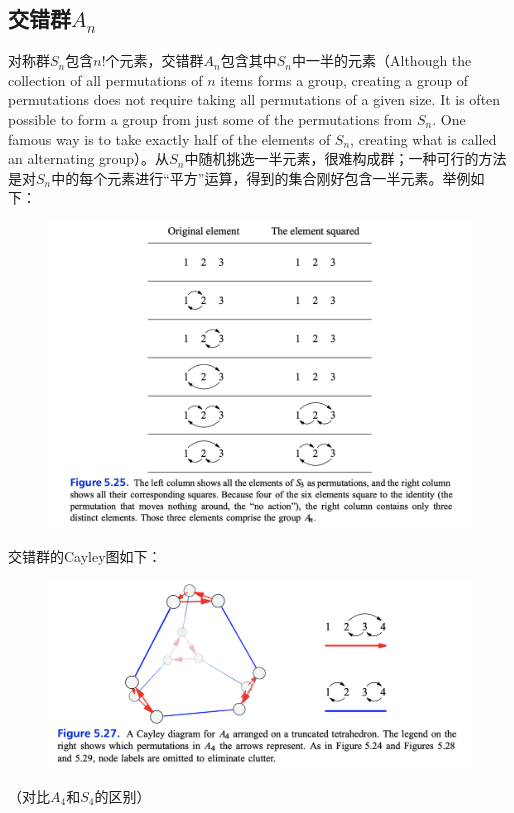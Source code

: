 \documentclass[12pt]{article}
\begin{document}
\subsection{交错群$A_n$}
对称群$S_n$包含$n!$个元素，交错群$A_n$包含其中$S_n$中一半的元素（Although the collection of all permutations of $n$ items forms a group, creating a group of permutations does not require taking all permutations of a given size. It is often possible to form a group from just some of the permutations from $S_n$. One famous way is to take exactly half of the elements of $S_n$, creating what is called an alternating group）。从$S_n$中随机挑选一半元素，很难构成群；一种可行的方法是对$S_n$中的每个元素进行“平方”运算，得到的集合刚好包含一半元素。举例如下：
\begin{figure}[H]
    \centering
    \includegraphics[width=1\textwidth]{fig/Group/AlternatingGroup-A3-creation.png}
\end{figure}

交错群的Cayley图如下：
\begin{figure}[H]
    \centering
    \includegraphics[width=1\textwidth]{fig/Group/Cayley-A4.png}
\end{figure}
（对比$A_4$和$S_4$的区别）
\end{document}
